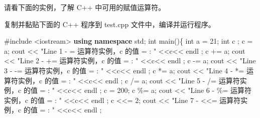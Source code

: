 \documentclass[
]{article}
\newenvironment{Shaded}{}{}
\newcommand{\DataTypeTok}[1]{\textcolor[rgb]{0.56,0.13,0.00}{#1}}
\newcommand{\DecValTok}[1]{\textcolor[rgb]{0.25,0.63,0.44}{#1}}
\newcommand{\ImportTok}[1]{#1}
\newcommand{\KeywordTok}[1]{\textcolor[rgb]{0.00,0.44,0.13}{\textbf{#1}}}
\newcommand{\NormalTok}[1]{#1}
\newcommand{\OperatorTok}[1]{\textcolor[rgb]{0.40,0.40,0.40}{#1}}
\newcommand{\PreprocessorTok}[1]{\textcolor[rgb]{0.74,0.48,0.00}{#1}}
\newcommand{\StringTok}[1]{\textcolor[rgb]{0.25,0.44,0.63}{#1}}
\begin{document}
请看下面的实例，了解 C++ 中可用的赋值运算符。

复制并黏贴下面的 C++ 程序到 test.cpp 文件中，编译并运行程序。

\begin{Shaded}
\begin{Highlighting}[]
\PreprocessorTok{\#include }\ImportTok{\textless{}iostream\textgreater{}}
\KeywordTok{using} \KeywordTok{namespace}\NormalTok{ std}\OperatorTok{;} 
\DataTypeTok{int}\NormalTok{ main}\OperatorTok{()\{}
   \DataTypeTok{int}\NormalTok{ a }\OperatorTok{=} \DecValTok{21}\OperatorTok{;}   \DataTypeTok{int}\NormalTok{ c }\OperatorTok{;} 
\NormalTok{   c }\OperatorTok{=}\NormalTok{  a}\OperatorTok{;}\NormalTok{   cout }\OperatorTok{\textless{}\textless{}} \StringTok{"Line 1 {-} =  运算符实例，c 的值 = : "} \OperatorTok{\textless{}\textless{}}\NormalTok{c}\OperatorTok{\textless{}\textless{}}\NormalTok{ endl }\OperatorTok{;} 
\NormalTok{   c }\OperatorTok{+=}\NormalTok{  a}\OperatorTok{;}\NormalTok{   cout }\OperatorTok{\textless{}\textless{}} \StringTok{"Line 2 {-} += 运算符实例，c 的值 = : "} \OperatorTok{\textless{}\textless{}}\NormalTok{c}\OperatorTok{\textless{}\textless{}}\NormalTok{ endl }\OperatorTok{;} 
\NormalTok{   c }\OperatorTok{{-}=}\NormalTok{  a}\OperatorTok{;}\NormalTok{   cout }\OperatorTok{\textless{}\textless{}} \StringTok{"Line 3 {-} {-}= 运算符实例，c 的值 = : "} \OperatorTok{\textless{}\textless{}}\NormalTok{c}\OperatorTok{\textless{}\textless{}}\NormalTok{ endl }\OperatorTok{;} 
\NormalTok{   c }\OperatorTok{*=}\NormalTok{  a}\OperatorTok{;}\NormalTok{   cout }\OperatorTok{\textless{}\textless{}} \StringTok{"Line 4 {-} *= 运算符实例，c 的值 = : "} \OperatorTok{\textless{}\textless{}}\NormalTok{c}\OperatorTok{\textless{}\textless{}}\NormalTok{ endl }\OperatorTok{;} 
\NormalTok{   c }\OperatorTok{/=}\NormalTok{  a}\OperatorTok{;}\NormalTok{   cout }\OperatorTok{\textless{}\textless{}} \StringTok{"Line 5 {-} /= 运算符实例，c 的值 = : "} \OperatorTok{\textless{}\textless{}}\NormalTok{c}\OperatorTok{\textless{}\textless{}}\NormalTok{ endl }\OperatorTok{;} 
\NormalTok{   c  }\OperatorTok{=} \DecValTok{200}\OperatorTok{;}\NormalTok{   c }\OperatorTok{\%=}\NormalTok{  a}\OperatorTok{;}\NormalTok{   cout }\OperatorTok{\textless{}\textless{}} \StringTok{"Line 6 {-} \%= 运算符实例，c 的值 = : "} \OperatorTok{\textless{}\textless{}}\NormalTok{c}\OperatorTok{\textless{}\textless{}}\NormalTok{ endl }\OperatorTok{;} 
\NormalTok{   c }\OperatorTok{\textless{}\textless{}=}  \DecValTok{2}\OperatorTok{;}\NormalTok{   cout }\OperatorTok{\textless{}\textless{}} \StringTok{"Line 7 {-} \textless{}\textless{}= 运算符实例，c 的值 = : "} \OperatorTok{\textless{}\textless{}}\NormalTok{c}\OperatorTok{\textless{}\textless{}}\NormalTok{ endl }\OperatorTok{;} 

\end{Highlighting}
\end{Shaded}
\end{document}
